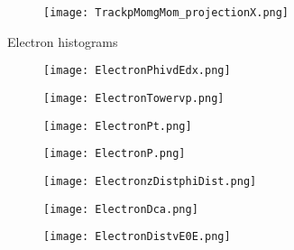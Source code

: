 \documentclass{beamer}
\begin{document}
\begin{frame}
  \begin{figure}[h!]
  \centering
  \texttt{[image: TrackpMomgMom\_projectionX.png]}
  \end{figure}
\end{frame}

\begin{frame}
  \begin{center}
 	\Huge Electron histograms
 	\end{center}
\end{frame}

\begin{frame}
  \begin{figure}[h!]
  \centering
  \texttt{[image: ElectronPhivdEdx.png]}
  \end{figure}
\end{frame}

\begin{frame}
  \begin{figure}[h!]
  \centering
  \texttt{[image: ElectronTowervp.png]}
  \end{figure}
\end{frame}

\begin{frame}
  \begin{figure}[h!]
  \centering
  \texttt{[image: ElectronPt.png]}
  \end{figure}
\end{frame}

\begin{frame}
  \begin{figure}[h!]
  \centering
  \texttt{[image: ElectronP.png]}
  \end{figure}
\end{frame}

\begin{frame}
  \begin{figure}[h!]
  \centering
  \texttt{[image: ElectronzDistphiDist.png]}
  \end{figure}
\end{frame}

\begin{frame}
  \begin{figure}[h!]
  \centering
  \texttt{[image: ElectronDca.png]}
  \end{figure}
\end{frame}

\begin{frame}
  \begin{figure}[h!]
  \centering
  \texttt{[image: ElectronDistvE0E.png]}
  \end{figure}
\end{frame}
\end{document}
